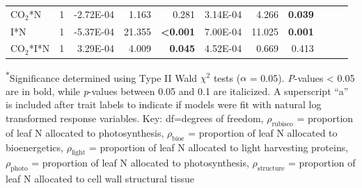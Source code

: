 \begin{landscape}
\begin{table}
{\begin{tabular}{p{3cm}p{0.5cm}p{1.75cm}p{1.5cm}p{1.5cm}p{1.75cm}p{1.5cm}p{1.5cm}p{1.75cm}p{1.5cm}p{1.5cm}}
            CO$_2$*N & \multicolumn{1}{r}{1}
            & \multicolumn{1}{r}{-2.72E-04}     & \multicolumn{1}{r}{1.163}         & \multicolumn{1}{r}{0.281}
            & \multicolumn{1}{r}{3.14E-04}      & \multicolumn{1}{r}{4.266}         & \multicolumn{1}{r}{\textbf{0.039}}
            & \multicolumn{1}{r}{}              & \multicolumn{1}{r}{}              & \multicolumn{1}{r}{} 
            \\

            I*N & \multicolumn{1}{r}{1}
            & \multicolumn{1}{r}{-5.37E-04}     & \multicolumn{1}{r}{21.355}        & \multicolumn{1}{r}{\textbf{<0.001}}
            & \multicolumn{1}{r}{7.00E-04}      & \multicolumn{1}{r}{11.025}        & \multicolumn{1}{r}{\textbf{0.001}}
            & \multicolumn{1}{r}{}              & \multicolumn{1}{r}{}              & \multicolumn{1}{r}{} 
            \\

            CO$_2$*I*N & \multicolumn{1}{r}{1}
            & \multicolumn{1}{r}{3.29E-04}      & \multicolumn{1}{r}{4.009}         & \multicolumn{1}{r}{\textbf{0.045}}
            & \multicolumn{1}{r}{4.52E-04}      & \multicolumn{1}{r}{0.669}         & \multicolumn{1}{r}{0.413}
            & \multicolumn{1}{r}{}              & \multicolumn{1}{r}{}              & \multicolumn{1}{r}{} 
            \\
            \hline
    \end{tabular}}
    \label{tab:table5.3}
    \end{table}
\begin{singlespace}
    \noindent \textsuperscript{$*$}Significance determined using Type II Wald $\chi^{2}$ tests ($\alpha$ = 0.05). \textit{P}-values < 0.05 are in bold, while \textit{p}-values between 0.05 and 0.1 are italicized. A superscript “a” is included after trait labels to indicate if models were fit with natural log transformed response variables. Key: df=degrees of freedom, $\rho_\mathrm{rubisco}$ = proportion of leaf N allocated to photosynthesis, $\rho_\mathrm{bioe}$ = proportion of leaf N allocated to bioenergetics, $\rho_\mathrm{light}$ = proportion of leaf N allocated to light harvesting proteins, $\rho_\mathrm{photo}$ = proportion of leaf N allocated to photosynthesis, $\rho_\mathrm{structure}$ = proportion of leaf N allocated to cell wall structural tissue
\end{singlespace}
\end{landscape}
\clearpage

